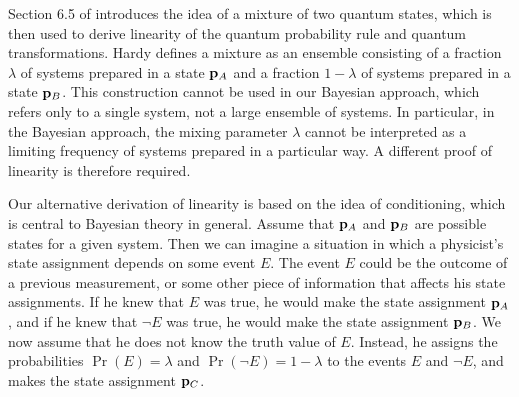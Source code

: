 \documentclass[pra,12pt,tightenlines]{revtex4}
\begin{document}
Section 6.5 of \cite{Hardy-0101} introduces the idea of a mixture of two
quantum states, which is then used to derive linearity of the quantum
probability rule and quantum transformations. Hardy defines a mixture as an
ensemble consisting of a fraction $\lambda$ of systems prepared in a state
${\bf p}_A$ and a fraction $1-\lambda$ of systems prepared in a state ${\bf p}_B$. This
construction cannot be used in our Bayesian approach, which refers only to a
single system, not a large ensemble of systems. In particular, in the
Bayesian approach, the mixing parameter $\lambda$ cannot be interpreted as 
a limiting frequency of systems prepared in a particular way. A different proof
of linearity is therefore required.

Our alternative derivation of linearity is based on the idea of conditioning,
which is central to Bayesian theory in general.  Assume that ${\bf p}_A$ and ${\bf p}_B$
are possible states for a given system. Then we can imagine a situation in
which a physicist's state assignment depends on some event $E$.  The event $E$
could be the outcome of a previous measurement, or some other piece of
information that affects his state assignments. If he knew that $E$ was true,
he would make the state assignment ${\bf p}_A$, and if he knew that $\neg E$ was
true, he would make the state assignment ${\bf p}_B$. We now assume that he
does not know the truth value of $E$.  Instead, he assigns the probabilities
$\Pr(E)=\lambda$ and $\Pr(\neg E)=1-\lambda$ to the events $E$ and $\neg E$,
and makes the state assignment ${\bf p}_C$.
\end{document}
